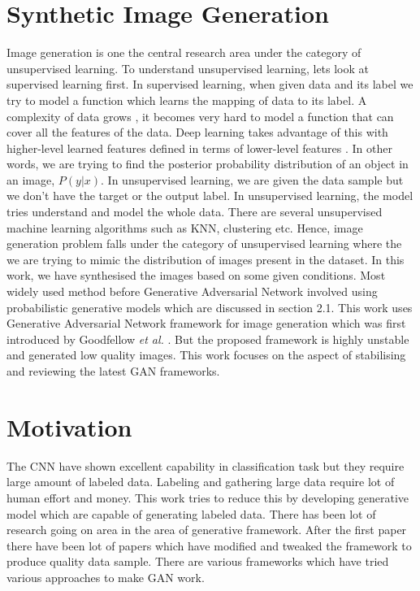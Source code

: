 \section{Synthetic Image Generation}
Image generation is one the central research area under the category of unsupervised learning. To understand unsupervised learning, lets look at supervised learning first. In supervised learning, when given data and its label we try to model a function which learns the mapping of data to its label. A complexity of data grows , it becomes very hard to model a function that can cover all the features of the data. Deep learning takes advantage of this with higher-level learned
features defined in terms of lower-level features \cite{bengio2012deep}. In other words, we are trying to find the posterior probability distribution of an object in an image, $P(y|x)$.
In unsupervised learning, we are given the data sample but we don't have the target or the output label. In unsupervised learning, the model tries understand and model the whole data. There are several unsupervised machine learning algorithms such as KNN, clustering etc. Hence, image generation problem falls under the category of unsupervised learning where the we are trying to mimic the distribution of images present in the dataset. In this work, we have synthesised the images based on some given conditions. Most widely used method before Generative Adversarial Network involved using probabilistic generative models which are discussed in section 2.1. This work uses Generative Adversarial Network framework for image generation which was first introduced by Goodfellow \textit{et al.} \cite{Original-GAN}. But the proposed  framework is highly unstable and generated low quality images. This work focuses on the aspect of stabilising and reviewing the latest GAN frameworks.

\section{Motivation}


The CNN have shown excellent capability in classification task\cite{CNN-Better} but they require large amount of labeled data. Labeling and gathering large data require lot of human effort and money. This work tries to reduce this by developing generative model which are capable of generating labeled data.
There has been lot of research going on area in the area of generative framework. After the first paper there have been lot of papers which have modified and tweaked the framework to produce quality data sample. There are various frameworks which have tried various approaches to make GAN work. 

